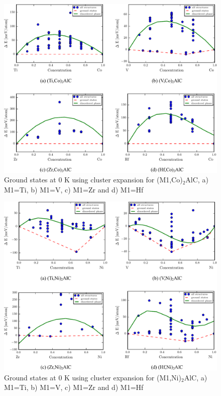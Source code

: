\documentclass[preprint,amsmath,amssymb,aps, prb,showkeys]{revtex4-1}
\begin{document}
\begin{figure}
\centering
\includegraphics[scale=0.5]{figure_24.pdf}   
\caption{Ground states at 0 K using cluster expansion for (M1,Co)$_2$AlC, a) M1=Ti, b) M1=V, c) M1=Zr and d) M1=Hf }
\end{figure}

\begin{figure}
\centering
\includegraphics[scale=0.5]{figure_25.pdf}   
\caption{Ground states at 0 K using cluster expansion for (M1,Ni)$_2$AlC, a) M1=Ti, b) M1=V, c) M1=Zr and d) M1=Hf }
\end{figure}
\end{document}
